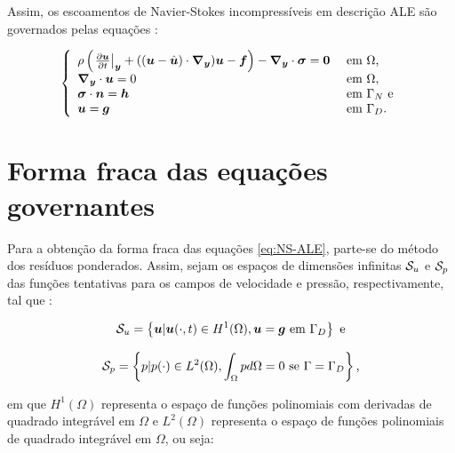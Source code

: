 Assim, os escoamentos de Navier-Stokes incompressíveis em descrição ALE são governados pelas equações \cite{bazilevs2013computational}:

\begin{equation}
    \left\{
    \begin{array}{ll}
        \rho\left({\left.\frac{\partial \boldsymbol{u}}{\partial t}\right|_{\boldsymbol{y}}+((\boldsymbol{u}-\hat{\boldsymbol{u}})\cdot\boldsymbol{\nabla_y})\boldsymbol{u}-\boldsymbol{f}}\right)-\boldsymbol{\nabla_y}\cdot\boldsymbol{\sigma}=\boldsymbol{0} & \text{ em }\Omega\text{,}    \\
        \boldsymbol{\nabla_y}\cdot\boldsymbol{u}=0                                                                         & \text{ em }\Omega\text{,}    \\
        \boldsymbol{\sigma}\cdot\boldsymbol{n}=\boldsymbol{h}                                                                  & \text{ em }\Gamma_N\text{ e} \\
        \boldsymbol{u}=\boldsymbol{g}                                                                            & \text{ em }\Gamma_D\text{.}
    \end{array}
    \right.
    \label{eq:NS-ALE}
\end{equation}

\section{Forma fraca das equações governantes} \label{FSD}

Para a obtenção da forma fraca das equações \eqref{eq:NS-ALE}, parte-se do método dos resíduos ponderados. Assim, sejam os espaços de dimensões infinitas $\mathcal{S}_u$ e $\mathcal{S}_p$ das funções tentativas para os campos de velocidade e pressão, respectivamente, tal que \cite{bazilevs2013computational,fernandes2020tecnica}:

\begin{equation}
    \mathcal{S}_u=\left\{\boldsymbol{u}|\boldsymbol{u}(\cdot,t)\in H^1(\Omega),\boldsymbol{u}=\boldsymbol{g}\text{ em }\Gamma_D\right\}\text{ e}
\end{equation}

\begin{equation}
    \mathcal{S}_p=\left\{p|p(\cdot)\in L^2(\Omega),\int_\Omega{pd\Omega}=0\text{ se }\Gamma=\Gamma_D\right\}\text{,}
\end{equation}

\noindent em que $H^1(\Omega)$ representa o espaço de funções polinomiais com derivadas de quadrado integrável em $\Omega$ e $L^2(\Omega)$ representa o espaço de funções polinomiais de quadrado integrável em $\Omega$, ou seja:

